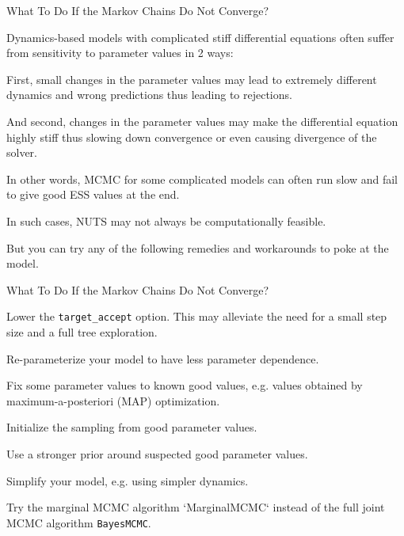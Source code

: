 \begin{frame}{What To Do If the Markov Chains Do Not Converge?}
    \begin{vfilleditems}
        \item Dynamics-based models with complicated stiff differential equations often suffer from sensitivity to parameter values in 2 ways:
            \begin{vfilleditems}
                \item First, small changes in the parameter values may lead to extremely different dynamics and wrong predictions thus leading to rejections.
                \item And second, changes in the parameter values may make the differential equation highly stiff thus slowing down convergence or even causing divergence of the solver.
            \end{vfilleditems}
        \item In other words, MCMC for some complicated models can often run slow and fail to give good ESS values at the end.
        \item In such cases, NUTS may not always be computationally feasible.
        \item But you can try any of the following remedies and workarounds to poke at the model.
    \end{vfilleditems}
\end{frame}

\begin{frame}{What To Do If the Markov Chains Do Not Converge?}
    \begin{vfilleditems}
        \item Lower the \lstinline{target_accept} option. This may alleviate the need for a small step size and a full tree exploration.
        \item Re-parameterize your model to have less parameter dependence.
        \item Fix some parameter values to known good values, e.g. values obtained by maximum-a-posteriori (MAP) optimization.
        \item Initialize the sampling from good parameter values.
        \item Use a stronger prior around suspected good parameter values.
        \item Simplify your model, e.g. using simpler dynamics.
        \item Try the marginal MCMC algorithm `MarginalMCMC` instead of the full joint MCMC algorithm \lstinline{BayesMCMC}.
    \end{vfilleditems}
\end{frame}

